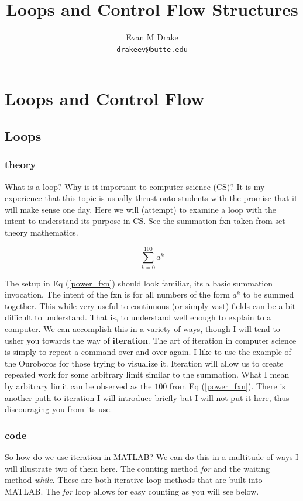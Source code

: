 \documentclass[12pt]{article}
\title{Loops and Control Flow Structures}
\author{
	Evan M Drake \\
	\texttt{drakeev@butte.edu}
}
\begin{document}
	\maketitle
	\tableofcontents

	\newpage


	\section{Loops and Control Flow}
		\subsection{Loops}
			\subsubsection{theory}
				What is a loop?
				Why is it important to computer science (CS)?
				It is my experience that this topic is usually thrust onto students with the promise that it will make sense one day.
				Here we will (attempt) to examine a loop with the intent to understand its purpose in CS.
				See the summation fxn taken from set theory mathematics.

				\begin{equation} \label{power_fxn}
					\sum^{100}_{k=0} a^k
				\end{equation}

				The setup in Eq (\eqref{power_fxn}) should look familiar,
					its a basic summation invocation.
				The intent of the fxn is for all numbers of the form $a^k$ to be summed together.
				This while very useful to continuous (or simply vast) fields can be a bit difficult to understand.
				That is, to understand well enough to explain to a computer.
				We can accomplish this in a variety of ways,
					though I will tend to usher you towards the way of \textbf{iteration}.
				The art of iteration in computer science is simply to repeat a command over and over again.
				I like to use the example of the Ouroboros for those trying to visualize it.
				Iteration will allow us to create repeated work for some arbitrary limit similar to the summation.
				What I mean by arbitrary limit can be observed as the $100$ from Eq (\eqref{power_fxn}).
				There is another path to iteration I will introduce briefly but I will not put it here,
					thus discouraging you from its use.

			\subsubsection{code}
				So how do we use iteration in MATLAB?
				We can do this in a multitude of ways I will illustrate two of them here.
				The counting method \textit{for} and the waiting method \textit{while}.
				These are both iterative loop methods that are built into MATLAB.
				The \textit{for} loop allows for easy counting as you will see below.
\end{document}
